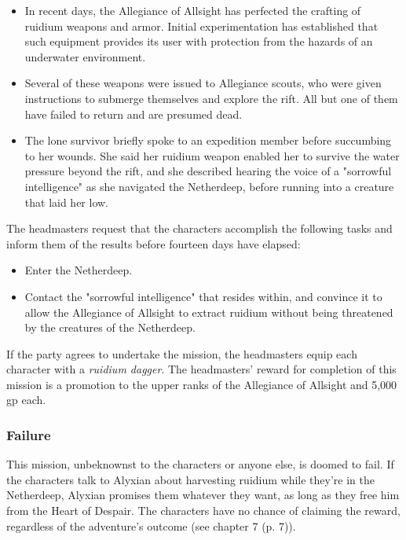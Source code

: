 \documentclass[letterpaper, 11pt, bg=full, twocolumn]{dndbook}
\begin{document}
\begin{itemize}
\item In recent days, the Allegiance of Allsight has perfected the crafting of ruidium weapons and armor. Initial experimentation has established that such equipment provides its user with protection from the hazards of an underwater environment.
\item Several of these weapons were issued to Allegiance scouts, who were given instructions to submerge themselves and explore the rift. All but one of them have failed to return and are presumed dead.
\item The lone survivor briefly spoke to an expedition member before succumbing to her wounds. She said her ruidium weapon enabled her to survive the water pressure beyond the rift, and she described hearing the voice of a "sorrowful intelligence" as she navigated the Netherdeep, before running into a creature that laid her low.
\end{itemize}

The headmasters request that the characters accomplish the following tasks and inform them of the results before fourteen days have elapsed:

\begin{itemize}
\item Enter the Netherdeep.
\item Contact the "sorrowful intelligence" that resides within, and convince it to allow the Allegiance of Allsight to extract ruidium without being threatened by the creatures of the Netherdeep.
\end{itemize}

If the party agrees to undertake the mission, the headmasters equip each character with a \textit{ruidium dagger}. The headmasters' reward for completion of this mission is a promotion to the upper ranks of the Allegiance of Allsight and 5,000 gp each.

\subsubsection{Failure}

This mission, unbeknownst to the characters or anyone else, is doomed to fail. If the characters talk to Alyxian about harvesting ruidium while they're in the Netherdeep, Alyxian promises them whatever they want, as long as they free him from the Heart of Despair. The characters have no chance of claiming the reward, regardless of the adventure's outcome (see chapter 7 (p. 7)).
\end{document}
